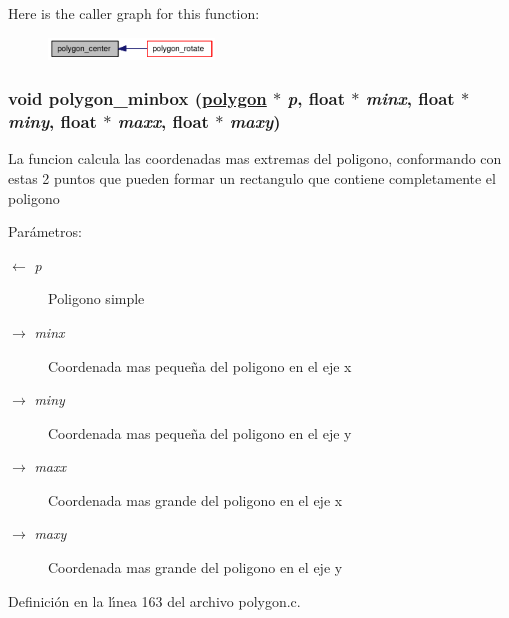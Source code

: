 Here is the caller graph for this function:\begin{figure}[H]
\begin{center}
\leavevmode
\includegraphics[width=125pt]{group__geometry_ge39fef354e4411678ec081c197b29825_ge39fef354e4411678ec081c197b29825_icgraph}
\end{center}
\end{figure}
\hypertarget{group__geometry_g137ef6f552a0a04c5ae0493690088f3f_g137ef6f552a0a04c5ae0493690088f3f}{
\subsubsection[polygon\_\-minbox]{\setlength{\rightskip}{0pt plus 5cm}void polygon\_\-minbox (\hyperlink{struct__polygon}{polygon} $\ast$ {\em p}, float $\ast$ {\em minx}, float $\ast$ {\em miny}, float $\ast$ {\em maxx}, float $\ast$ {\em maxy})}}
\label{group__geometry_g137ef6f552a0a04c5ae0493690088f3f_g137ef6f552a0a04c5ae0493690088f3f}


La funcion calcula las coordenadas mas extremas del poligono, conformando con estas 2 puntos que pueden formar un rectangulo que contiene completamente el poligono

\begin{Desc}
\item[Par\'{a}metros:]
\begin{description}
\item[\mbox{$\leftarrow$} {\em p}]Poligono simple \item[\mbox{$\rightarrow$} {\em minx}]Coordenada mas peque\~{n}a del poligono en el eje x \item[\mbox{$\rightarrow$} {\em miny}]Coordenada mas peque\~{n}a del poligono en el eje y \item[\mbox{$\rightarrow$} {\em maxx}]Coordenada mas grande del poligono en el eje x \item[\mbox{$\rightarrow$} {\em maxy}]Coordenada mas grande del poligono en el eje y \end{description}
\end{Desc}


Definici\'{o}n en la l\'{\i}nea 163 del archivo polygon.c.

